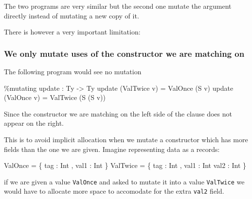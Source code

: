 \documentclass[
]{article}
\newenvironment{Shaded}{}{}
\newcommand{\DataTypeTok}[1]{\textcolor[rgb]{0.56,0.13,0.00}{#1}}
\newcommand{\NormalTok}[1]{#1}
\newcommand{\OperatorTok}[1]{\textcolor[rgb]{0.40,0.40,0.40}{#1}}
\newcommand{\OtherTok}[1]{\textcolor[rgb]{0.00,0.44,0.13}{#1}}
\begin{document}
The two programs are very similar but the second one mutate the argument
directly instead of mutating a new copy of it.

There is however a very important limitation:

\hypertarget{we-only-mutate-uses-of-the-constructor-we-are-matching-on}{%
\subsubsection{We only mutate uses of the constructor we are matching
on}\label{we-only-mutate-uses-of-the-constructor-we-are-matching-on}}

The following program would see no mutation

\begin{Shaded}
\begin{Highlighting}[]
\OperatorTok{\%}\NormalTok{mutating}
\NormalTok{update }\OperatorTok{:} \DataTypeTok{Ty} \OtherTok{{-}\textgreater{}} \DataTypeTok{Ty}
\NormalTok{update (}\DataTypeTok{ValTwice}\NormalTok{ v) }\OtherTok{=} \DataTypeTok{ValOnce}\NormalTok{ (}\DataTypeTok{S}\NormalTok{ v)}
\NormalTok{update (}\DataTypeTok{ValOnce}\NormalTok{ v) }\OtherTok{=} \DataTypeTok{ValTwice}\NormalTok{ (}\DataTypeTok{S}\NormalTok{ (}\DataTypeTok{S}\NormalTok{ v))}
\end{Highlighting}
\end{Shaded}

Since the constructor we are matching on the left side of the clause
does not appear on the right.

This is to avoid implicit allocation when we mutate a constructor which
has more fields than the one we are given. Imagine representing data as
a records:

\begin{Shaded}
\begin{Highlighting}[]
\DataTypeTok{ValOnce} \OtherTok{=}\NormalTok{ \{ tag }\OperatorTok{:} \DataTypeTok{Int}\NormalTok{ , val1 }\OperatorTok{:} \DataTypeTok{Int}\NormalTok{ \}}
\DataTypeTok{ValTwice} \OtherTok{=}\NormalTok{ \{ tag }\OperatorTok{:} \DataTypeTok{Int}\NormalTok{ , val1 }\OperatorTok{:} \DataTypeTok{Int}\NormalTok{ val2 }\OperatorTok{:} \DataTypeTok{Int}\NormalTok{ \}}
\end{Highlighting}
\end{Shaded}

if we are given a value \texttt{ValOnce} and asked to mutate it into a
value \texttt{ValTwice} we would have to allocate more space to
accomodate for the extra \texttt{val2} field.
\end{document}
